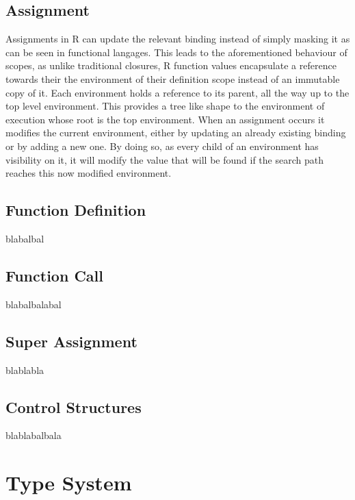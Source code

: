 \subsection{Assignment}

Assignments in R can update the relevant binding instead of simply masking it as can be seen in functional langages. This leads to the aforementioned behaviour of scopes, as unlike traditional closures, R function values encapsulate a reference towards their the environment of their definition scope instead of an immutable copy of it. Each environment holds a reference to its parent, all the way up to the top level environment. This provides a tree like shape to the environment of execution whose root is the top environment. When an assignment occurs it modifies the current environment, either by updating an already existing binding or by adding a new one. By doing so, as every child of an environment has visibility on it, it will modify the value that will be found if the search path reaches this now modified environment.

\subsection{Function Definition}

blabalbal

\subsection{Function Call}

blabalbalabal

\subsection{Super Assignment}

blablabla



\subsection{Control Structures}

blablabalbala





\section{Type System}

